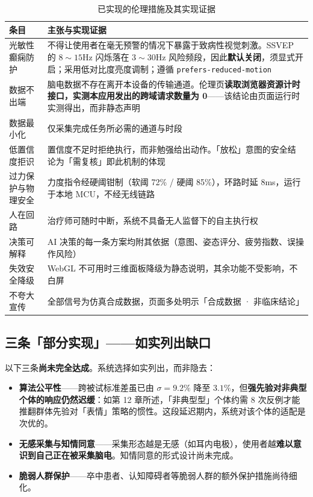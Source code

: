 \documentclass[11pt, a4paper]{ctexart}
\begin{document}
\begin{table}[htbp]
\centering
\caption{已实现的伦理措施及其实现证据}
\begin{tabularx}{\textwidth}{@{}l X@{}}
\toprule
\sffamily\bfseries 条目 & \sffamily\bfseries 主张与实现证据 \\
\midrule
光敏性癫痫防护 & 不得让使用者在毫无预警的情况下暴露于致病性视觉刺激。SSVEP 的 $8\sim 15$Hz 闪烁落在 $3\sim 30$Hz 风险频段，因此\textbf{默认关闭}，须显式开启；采用低对比度亮度调制；遵循 \texttt{prefers-reduced-motion} \\
数据不出端     & 脑电数据不存在离开本设备的传输通道。伦理页\textbf{读取浏览器资源计时接口，实测本应用发出的跨域请求数量为 0}——该结论由页面运行时实测得出，而非静态声明 \\
数据最小化     & 仅采集完成任务所必需的通道与时段 \\
低置信度拒识   & 置信度不足时拒绝执行，而非勉强给出动作。「放松」意图的安全结论为「需复核」即此机制的体现 \\
过力保护与物理安全 & 力度指令经硬阈钳制（软阈 72\% / 硬阈 85\%），环路时延 8ms，运行于本地 MCU，不经无线链路 \\
人在回路       & 治疗师可随时中断，系统不具备无人监督下的自主执行权 \\
决策可解释     & AI 决策的每一条方案均附其依据（意图、姿态评分、疲劳指数、误操作风险） \\
失效安全降级   & WebGL 不可用时三维面板降级为静态说明，其余功能不受影响，不白屏 \\
不夸大宣传     & 全部信号为仿真合成数据，页面多处明示「合成数据 · 非临床结论」 \\
\bottomrule
\end{tabularx}
\end{table}

\subsection{三条「部分实现」——如实列出缺口}

\begin{warnbox}
以下三条\textbf{尚未完全达成}。系统选择如实列出，而非隐去：

\begin{itemize}[itemsep=4pt, topsep=4pt]
  \item \textbf{算法公平性}——跨被试标准差虽已由 $\sigma = 9.2\%$ 降至 $3.1\%$，但\textbf{强先验对非典型个体的响应仍然迟缓}：如第 12 章所述，「非典型型」个体约需 8 次反例才能推翻群体先验对「表情」策略的惯性。这段延迟期内，系统对该个体的适配是次优的。
  \item \textbf{无感采集与知情同意}——采集形态越是无感（如耳内电极），使用者越\textbf{难以意识到自己正在被采集脑电}。知情同意的形式设计尚未完成。
  \item \textbf{脆弱人群保护}——卒中患者、认知障碍者等脆弱人群的额外保护措施尚待细化。
\end{itemize}
\end{warnbox}
\end{document}
